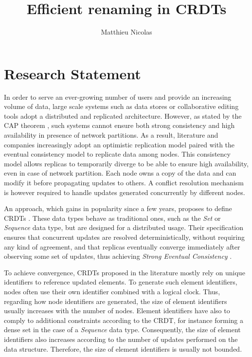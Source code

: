 \documentclass[sigplan]{acmart}
\begin{document}
\title{Efficient renaming in \acp{CRDT}}
\author{Matthieu Nicolas}

\renewcommand{\shortauthors}{M. Nicolas}

\begin{abstract}
\end{abstract}

\maketitle

\section{Research Statement}

In order to serve an ever-growing number of users and provide an increasing volume of data,
large scale systems such as data stores or collaborative editing tools adopt a distributed and replicated architecture.
However, as stated by the CAP theorem \cite{brewer_2000_podc}, such systems cannot ensure both strong consistency and high availability in presence of network partitions.
As a result, literature and companies increasingly adopt an optimistic replication model \cite{saito_2005_optimistic-replication} paired with the eventual consistency model to replicate data among nodes.
This consistency model allows replicas to temporarily diverge to be able to ensure high availability, even in case of network partition.
Each node owns a copy of the data and can modify it before propagating updates to others.
A conflict resolution mechanism is however required to handle updates generated concurrently by different nodes.

An approach, which gains in popularity since a few years, proposes to define \acfp{CRDT} \cite{shapiro_2011_crdt}.
These data types behave as traditional ones, such as the \emph{Set} or \emph{Sequence} data type, but are designed for a distributed usage.
Their specification ensures that concurrent updates are resolved deterministically, without requiring any kind of agreement, and that replicas eventually converge immediately after observing some set of updates,
thus achieving \emph{Strong Eventual Consistency} \cite{shapiro_2011_crdt}.

To achieve convergence, \acp{CRDT} proposed in the literature mostly rely on unique identifiers to reference updated elements.
To generate such element identifiers, nodes often use their own identifier combined with a logical clock.
Thus, regarding how node identifiers are generated, the size of element identifiers usually increases with the number of nodes.
Element identifiers have also to comply to additional constraints according to the \ac{CRDT}, for instance forming a dense set in the case of a \emph{Sequence} data type.
Consequently, the size of element identifiers also increases according to the number of updates performed on the data structure.
Therefore, the size of element identifiers is usually not bounded.
\end{document}
